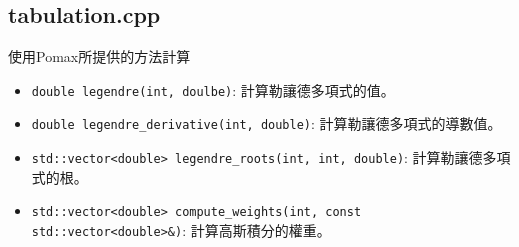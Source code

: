 \documentclass[a4paper,12pt]{article}
\begin{document}
\subsection{tabulation.cpp}
使用Pomax所提供的方法計算\cite{pomax_legendre_gauss}
\begin{itemize}
    \begin{enumerate}
        \item 取得Legender Polynomial的值。\\
        $ P_{n}(x) = \frac{2n - 1}{n} x * P_{n-1}(x) - \frac{n - 1}{n} P_{n-2}(x) \quad (n \geq 2) $
        \item 使用牛頓法計算根。\\
        $ x_{0} = cos(\pi * (n - i - 0.25) / (n + 0.5)) $\\
        $ x_{j + 1} = x_{j} - P_{n}(x_{j}) / P'_{n}(x_{j}) $
        \item 計算權重。\\
        $ w_{i} = 2 / ((1 - x_{i}^{2}) * (P'_{n}(x_{i}))^{2}) $
    \end{enumerate}
    \item \texttt{double legendre(int, doulbe)}: 計算勒讓德多項式的值。
    \item \texttt{double legendre\_derivative(int, double)}: 計算勒讓德多項式的導數值。
    \item \texttt{std::vector<double> legendre\_roots(int, int, double)}: 計算勒讓德多項式的根。
    \item \texttt{std::vector<double> compute\_weights(int, const std::vector<double>&)}: 計算高斯積分的權重。 
\end{itemize}
\end{document}

